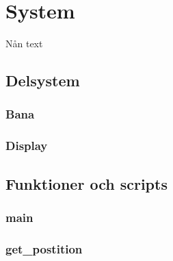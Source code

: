 \section{System}
 Nån text
	\subsection{Delsystem}
		\subsubsection{Bana}
		\subsubsection{Display}
	\subsection{Funktioner och scripts}
		\subsubsection{main}
		\subsubsection{get\_postition}

% 
% 
